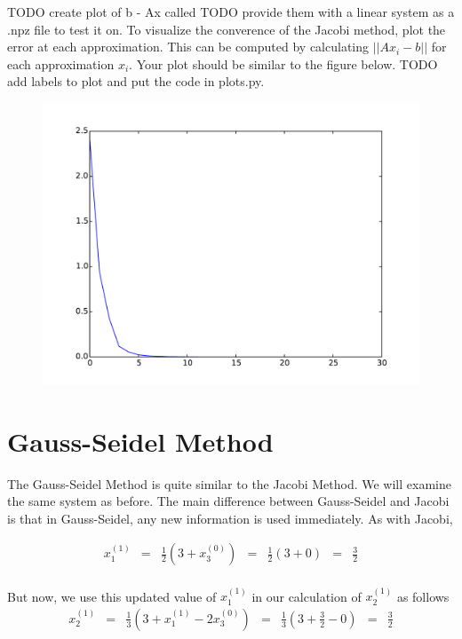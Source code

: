 \begin{problem}
    TODO create plot of b - Ax called %
    TODO provide them with a linear system as a .npz file to test it on.
To visualize the converence of the Jacobi method, plot the error at each approximation. This can be computed by calculating $||Ax_i - b||$ for each approximation $x_i$. Your plot should be similar to the figure below. TODO add labels to plot and put the code in plots.py.

\begin{figure}[H]
\includegraphics[width=.7\textwidth]{jacobi_convergence.pdf}
\label{fig:jacobi_convergence}
\end{figure}
\end{problem}

\section*{Gauss-Seidel Method}
The Gauss-Seidel Method is quite similar to the Jacobi Method. We will examine the same system as before. The main difference between Gauss-Seidel and Jacobi is that in Gauss-Seidel, any new information is used immediately. As with Jacobi,

$$
\begin{matrix}
x^{(1)}_1 & = & \frac{1}{2} ( 3 + x^{(0)}_3)  & = & \frac{1}{2} (3 + 0)     & = & \frac{3}{2} \\
\end{matrix}
$$

But now, we use this updated value of $x^{(1)}_1$ in our calculation of $x^{(1)}_2$ as follows
$$
\begin{matrix}
x^{(1)}_2 & = & \frac{1}{3} ( 3 + x^{(1)}_1 - 2x^{(0)}_3) & = & \frac{1}{3} (3 + \frac{3}{2} - 0) & = & \frac{3}{2} \\
\end{matrix}
$$

